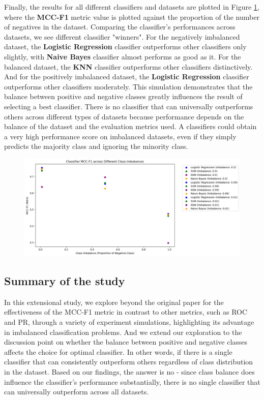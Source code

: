 \documentclass[12pt, oneside]{amsart}
\theoremstyle{definition}
\theoremstyle{remark}
\numberwithin{equation}{section}
\begin{document}
Finally, the results for all different classifiers and datasets are plotted in Figure \ref{simulation4}, where the \textbf{MCC-F1} metric value is plotted against the proportion of the number of negatives in the dataset. Comparing the classifier's performances across datasets, we see different classifier "winners". For the negatively imbalanced dataset, the \textbf{Logistic Regression} classifier outperforms other classifiers only slightly, with \textbf{Naive Bayes} classifier almost performs as good as it. For the balanced dataset, the \textbf{KNN} classifier outperforms other classifiers distinctively. And for the positively imbalanced dataset, the \textbf{Logistic Regression} classifier outperforms other classifiers moderately. This simulation demonstrates that the balance between positive and negative classes greatly influences the result of selecting a best classifier. There is no classifier that can universally outperforms others across different types of datasets because performance depends on the balance of the dataset and the evaluation metrics used. A classifiers could obtain a very high performance score on imbalanced datasets, even if they simply predicts the majority class and ignoring the minority class. 
\begin{figure}[hbt!]
    \centering
    \includegraphics[scale=0.4]{Report/Figure/simulation4.jpg}
    \caption{}
    \label{simulation4}
\end{figure}
\FloatBarrier


\subsection{Summary of the study}
In this extensional study, we explore beyond the original paper for the effectiveness of the MCC-F1 metric in contrast to other metrics, such as ROC and PR, through a variety of experiment simulations, highlighting its advantage in imbalanced classification problems. And we extend our exploration to the discussion point on whether the balance between positive and negative classes affects the choice for optimal classifier. In other words, if there is a single classifier that can consistently outperform others regardless of class distribution in the dataset. Based on our findings, the answer is no - since class balance does influence the classifier's performance substantially, there is no single classifier that can universally outperform across all datasets.

\clearpage
\printbibliography
\end{document}
